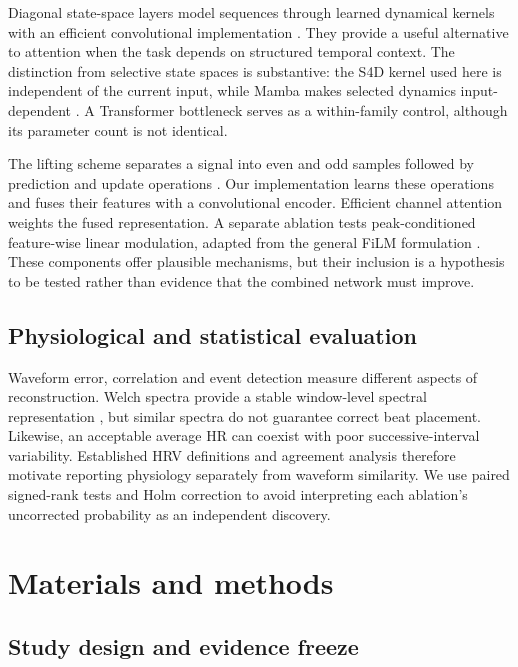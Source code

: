 \documentclass[11pt,a4paper]{article}
\begin{document}
Diagonal state-space layers model sequences through learned dynamical kernels with an efficient
convolutional implementation \citep{s4d}. They provide a useful alternative to attention when
the task depends on structured temporal context. The distinction from selective state spaces
is substantive: the S4D kernel used here is independent of the current input, while Mamba makes
selected dynamics input-dependent \citep{mamba}. A Transformer bottleneck \citep{attention}
serves as a within-family control, although its parameter count is not identical.

The lifting scheme separates a signal into even and odd samples followed by prediction and
update operations \citep{lifting}. Our implementation learns these operations and fuses their
features with a convolutional encoder. Efficient channel attention \citep{eca} weights the
fused representation. A separate ablation tests peak-conditioned feature-wise linear
modulation, adapted from the general FiLM formulation \citep{film}. These components offer
plausible mechanisms, but their inclusion is a hypothesis to be tested rather than evidence
that the combined network must improve.

\subsection{Physiological and statistical evaluation}

Waveform error, correlation and event detection measure different aspects of reconstruction.
Welch spectra provide a stable window-level spectral representation \citep{welch}, but
similar spectra do not guarantee correct beat placement. Likewise, an acceptable average HR
can coexist with poor successive-interval variability. Established HRV definitions
\citep{hrvstandards,hrvoverview} and agreement analysis \citep{blandaltman} therefore motivate
reporting physiology separately from waveform similarity. We use paired signed-rank tests
\citep{wilcoxon} and Holm correction \citep{holm} to avoid interpreting each ablation's
uncorrected probability as an independent discovery.

\section{Materials and methods}

\subsection{Study design and evidence freeze}
\end{document}
